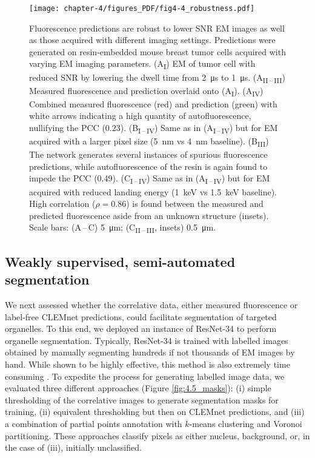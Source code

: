 \begin{figure}[!tb]
    \centering
    \texttt{[image: chapter-4/figures\_PDF/fig4-4\_robustness.pdf]}
    \caption{Fluorescence predictions are robust to lower SNR EM images as well as those acquired with different imaging settings.
    Predictions were generated on resin-embedded mouse breast tumor cells acquired with varying EM imaging parameters.
    (A\textsubscript{I}) EM of tumor cell with reduced SNR by lowering the dwell time from \SI{2}{\micro\second} to \SI{1}{\micro\second}. (A\textsubscript{II\,--\,III}) Measured fluorescence and prediction overlaid onto (A\textsubscript{I}). (A\textsubscript{IV}) Combined measured fluorescence (red) and prediction (green) with white arrows indicating a high quantity of autofluorescence, nullifying the PCC (0.23).
    (B\textsubscript{I\,--\,IV}) Same as in (A\textsubscript{I\,--\,IV}) but for EM acquired with a larger pixel size (\SI{5}{\nano\meter} vs \SI{4}{\nano\meter} baseline). (B\textsubscript{III}) The network generates several instances of spurious fluorescence predictions, while autofluorescence of the resin is again found to impede the PCC (0.49).
    (C\textsubscript{I\,--\,IV}) Same as in (A\textsubscript{I\,--\,IV}) but for EM acquired with reduced landing energy (\SI{1}{\kilo\electronvolt} vs  \SI{1.5}{\kilo\electronvolt} baseline). High correlation ($\rho\!=\!\text{0.86}$) is found between the measured and predicted fluorescence aside from an unknown structure (insets). Scale bars: (A\,--\,C) \SI{5}{\micro\meter}; (C\textsubscript{II\,--\,III}, insets) \SI{0.5}{\micro\meter}.}
    \label{fig:4.4_robustness}
\end{figure}


\subsection{Weakly supervised, semi-automated segmentation}
\label{sec:4results_segmentation}

We next assessed whether the correlative data, either measured fluorescence or label-free CLEMnet predictions, could facilitate segmentation of targeted organelles. To this end, we deployed an instance of ResNet-34 \cite{he2016deep} to perform organelle segmentation. Typically, ResNet-34 is trained with labelled images obtained by manually segmenting hundreds if not thousands of EM images by hand. While shown to be highly effective, this method is also extremely time consuming \needref. To expedite the process for generating labelled image data, we evaluated three different approaches (Figure \ref{fig:4.5_masks}): (i) simple thresholding of the correlative images to generate segmentation masks for training, (ii) equivalent thresholding but then on CLEMnet predictions, and (iii) a combination of partial points annotation with $k$-means clustering and Voronoi partitioning. These approaches classify pixels as either nucleus, background, or, in the case of (iii), initially unclassified.

